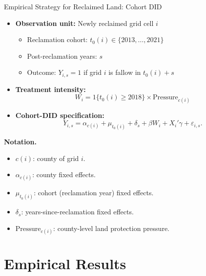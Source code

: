 \documentclass[10pt, xcolor=x11names,compress, aspectratio=169]{beamer}
\begin{document}
\begin{frame}{Empirical Strategy for Reclaimed Land: Cohort DID}

\begin{itemize}

    \item \textbf{Observation unit:} Newly reclaimed grid cell $i$
    \begin{itemize}
        \item Reclamation cohort: $t_0(i) \in \{2013,\ldots,2021\}$
        \item Post-reclamation years: $s$
        \item Outcome: $Y_{i,s}=1$ if grid $i$ is fallow in $t_0(i)+s$
    \end{itemize}

    \vspace{0.8em}

    \item \textbf{Treatment intensity:}
    \[
        W_i = 1\{t_0(i)\ge 2018\} \times \text{Pressure}_{c(i)}
    \]

    \vspace{0.6em}

    \item \textbf{Cohort-DID specification:}
    \[
        Y_{i,s}
        =
        \alpha_{c(i)} 
        + 
        \mu_{t_0(i)}
        +
        \delta_s
        +
        \beta W_i
        +
        X_i'\gamma
        +
        \varepsilon_{i,s}.
    \]

\end{itemize}

\bigskip

\textbf{Notation.}
\begin{itemize}\setlength{\itemsep}{6pt}
    \item $c(i)$: county of grid $i$.
    \item $\alpha_{c(i)}$: county fixed effects.
    \item $\mu_{t_0(i)}$: cohort (reclamation year) fixed effects.
    \item $\delta_s$: years-since-reclamation fixed effects.
    \item $\text{Pressure}_{c(i)}$: county-level land protection pressure.
\end{itemize}

\end{frame}





\section*{Empirical Results}
\end{document}
